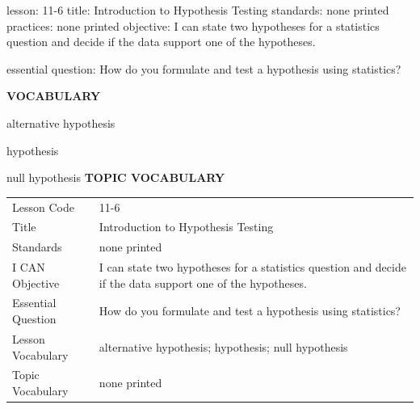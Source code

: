 \documentclass{article}
\newenvironment{lesson-meta}{}{}        %
\newcommand{\te}[1]{}                   %
\begin{document}
\begin{lesson-meta}
lesson: 11-6
title: Introduction to Hypothesis Testing
standards: none printed
practices: none printed
objective: I can state two hypotheses for a statistics question and decide if the data support one of the hypotheses.

essential question: How do you formulate and test a hypothesis using statistics?

\textbf{VOCABULARY}
\item alternative hypothesis
\item hypothesis
\item null hypothesis
\textbf{TOPIC VOCABULARY}
\te{No separate topic vocabulary list is printed on these pages.}
\begin{tabular}{ll}
Lesson Code & 11-6 \\
Title & Introduction to Hypothesis Testing \\
Standards & none printed \\
I CAN Objective & I can state two hypotheses for a statistics question and decide if the data support one of the hypotheses. \\
Essential Question & How do you formulate and test a hypothesis using statistics? \\
Lesson Vocabulary & alternative hypothesis; hypothesis; null hypothesis \\
Topic Vocabulary & none printed \\
\end{tabular}
\end{lesson-meta}
\end{document}
